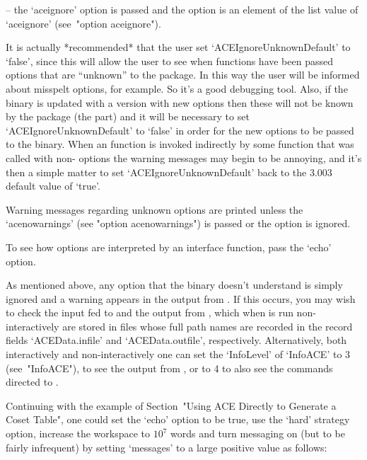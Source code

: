 \item{--} the `aceignore' option  is  passed  and  the  option  is  an
element of the list value of `aceignore' (see~"option aceignore").

\endlist

It    is    actually    *recommended*    that     the     user     set
`ACEIgnoreUnknownDefault' to `false', since this will allow  the  user
to see when  {\ACE}  functions  have  been  passed  options  that  are
``unknown'' to the {\ACE} package.  In  this  way  the  user  will  be
informed about misspelt options, for example. So it's a good debugging
tool. Also, if the {\ACE} binary is updated with a  version  with  new
options then these will not be known by the package (the {\GAP}  part)
and it will be necessary to set `ACEIgnoreUnknownDefault'  to  `false'
in order for the new options to be  passed  to  the  binary.  When  an
{\ACE} function is invoked indirectly by some function that was called
with non-{\ACE} options the warning messages may begin to be annoying,
and it's then a simple matter to set `ACEIgnoreUnknownDefault' back to
the {\ACE} 3.003 default value of `true'.

Warning messages regarding unknown  options  are  printed  unless  the
`acenowarnings' (see "option acenowarnings") is passed or  the  option
is ignored.

To see how options are interpreted by an  {\ACE}  interface  function,
pass the `echo' option.

As  mentioned  above,  any  option  that  the  {\ACE}  binary  doesn't
understand is simply ignored and a warning appears in the output  from
{\ACE}. If this occurs, you may wish to check the input fed to  {\ACE}
and the output from {\ACE}, which when {\ACE} is run non-interactively
are stored in files whose full path names are recorded in  the  record
fields   `ACEData.infile'   and    `ACEData.outfile',    respectively.
Alternatively, both interactively and non-interactively  one  can  set
the `InfoLevel' of `InfoACE' to 3 (see~"InfoACE"), to see  the
output from {\ACE}, or to 4 to  also  see  the  commands  directed  to
{\ACE}.


Continuing with the example of Section~"Using ACE Directly to Generate
a Coset Table", one could set the `echo' option to be  true,  use  the
`hard' strategy option, increase the workspace  to  $10^7$  words  and
turn messaging on (but to be fairly infrequent) by setting  `messages'
to a large positive value as follows:

